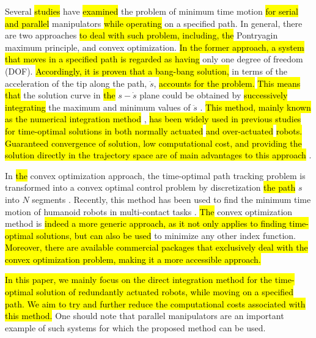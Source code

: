 \documentclass{rob}%
\begin{document}
Several \hl{studies} have \hl{examined} the problem of minimum time motion \hl{for serial and parallel} manipulators \hl{while operating} on a specified path.
In general, there are two approaches \hl{to deal with such problem, including, the} Pontryagin maximum principle, and convex optimization. 
\hl{In the former approach, a system that moves in a specified path is regarded as having} only one degree of freedom (DOF). \hl{Accordingly, it is proven that a bang-bang solution,} in terms of the acceleration of the tip along the path, $ \ddot s $, \hl{accounts for the problem.}
\hl{This means that} the solution curve in \hl{the} $ s-\dot s $ plane could be obtained by \hl{successively integrating} the maximum and minimum values of $ \ddot s $ \cite{Bobrow1985}. \hl{This method, mainly known as the numerical integration method} \cite{Pham2014}, \hl{has been widely used in previous studies for time-optimal solutions in both normally actuated} \cite{Bobrow1985, Pfeiffer1987, Zlajpah1996, Kunz2012, Nguyen2016 , Shen2017 , Behzadipour2006} \hl{and over-actuated} \cite{Moon1990, Bobrow1990,  Moon1991, Moon1997, McCarthy1992, Ghasemi2008, Sadigh2013, Pham2012, Caron2017} \hl{robots. Guaranteed convergence of solution, low computational cost, and providing the solution directly in the trajectory space are of main advantages to this approach} \cite{Pham2015}.
	
In \hl{the} convex optimization approach, the time-optimal path tracking problem is transformed into a convex optimal control problem by discretization \hl{the path} $ s $ into $ N $ segments \cite{Verscheure2009, Zhang2016, Zhao2017}. Recently, this method has been used to find the minimum time motion of humanoid robots in multi-contact tasks \cite{Hauser2014}.
\hl{The} convex optimization method is \hl{indeed a more generic approach, as it not only applies to finding time-optimal solutions, but can also be used} to minimize any other index function.
\hl{Moreover, there are available commercial packages that exclusively deal with the convex optimization problem, making it a more accessible approach.}
	
\hl{In this paper, we mainly focus on the direct integration method for the time-optimal solution of redundantly actuated robots, while moving on a specified path. We aim to try and further reduce the computational costs associated with this method.} One should note that parallel manipulators are an important example of such systems for which the proposed method can be used.
	
\end{document}
